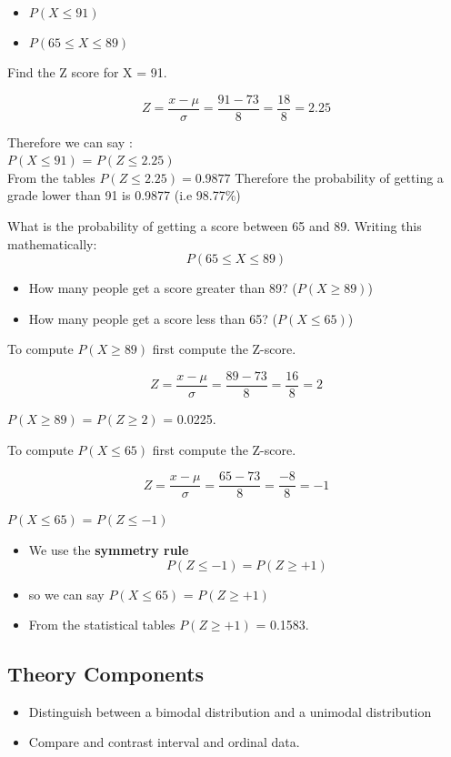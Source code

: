 \documentclass[a4paper,12pt]{article}
\begin{document}
\begin{itemize}
\item $P(X \leq 91)$
\item $P(65 \leq X \leq 89)$
\end{itemize}
Find the Z score for X = 91.

\[ Z = \frac{x- \mu}{ \sigma} = \frac{91 - 73}{8} =\frac{18}{8} = 2.25\]

Therefore we can say :\\ $P(X \leq 91)$ = $P(Z \leq 2.25)$ \\


From the tables $P(Z \leq 2.25) = 0.9877$
Therefore the probability of getting a grade lower than 91 is 0.9877 (i.e 98.77\%)


What is the probability of getting a score between 65 and 89.
Writing this mathematically:
\[ P(65 \leq X \leq 89) \]

\newpage
\begin{itemize}
\item How many people get a score greater than 89? ($P(X\geq 89)$)
\item How many people get a score less than 65? ($P(X\leq 65)$)
\end{itemize}

To compute $P(X \geq 89)$ first compute the Z-score.

\[ Z = \frac{x - \mu}{\sigma} = \frac{89 - 73}{8} =\frac{16}{8} = 2 \]

$P(X \geq 89)$ = $P(Z \geq 2)$ = 0.0225.

To compute $P(X \leq 65)$ first compute the Z-score.

\[ Z = \frac{x - \mu}{\sigma} = \frac{65 - 73}{8} =\frac{-8}{8} = -1 \]

$P(X \leq 65)$ = $P(Z \leq -1)$ 

\begin{itemize}
\item We use the \textbf{symmetry rule}
\[ P(Z \leq -1) = P(Z \geq +1) \]
\item so we can say $P(X \leq 65)$ = $P(Z \geq +1)$ 
\item From the statistical tables $P(Z \geq +1)$ = 0.1583.
\end{itemize}

\subsection*{Theory Components}
\begin{itemize}
\item Distinguish between a bimodal distribution and a unimodal distribution
\item Compare and contrast interval and ordinal data.
\end{itemize}
\newpage
\end{document}
